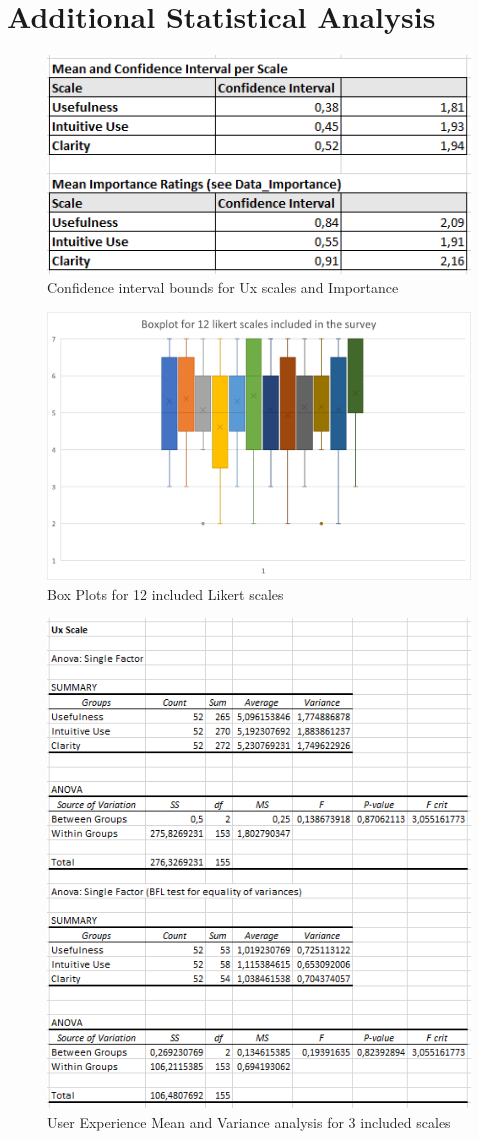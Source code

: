 \documentclass[a4paper, 11pt]{article}
\begin{document}
\section{Additional Statistical Analysis}\label{app:anova}
\begin{figure}[h!]
	\centering
	\includegraphics[width=0.7\linewidth]{figures/confint}
	\caption{Confidence interval bounds for Ux scales and Importance}
	\label{fig:confint}
\end{figure}
\begin{figure}[h!]
	\centering
	\includegraphics[width=0.8\linewidth]{figures/boxplot}
	\caption{Box Plots for 12 included Likert scales}
	\label{fig:boxplot}
\end{figure}
\newpage
\begin{figure}[h!]
	\centering
	\includegraphics[width=0.7\linewidth]{figures/UxScale}
	\caption{User Experience Mean and Variance analysis for 3 included scales}
	\label{fig:uxscale}
\end{figure}
\end{document}
